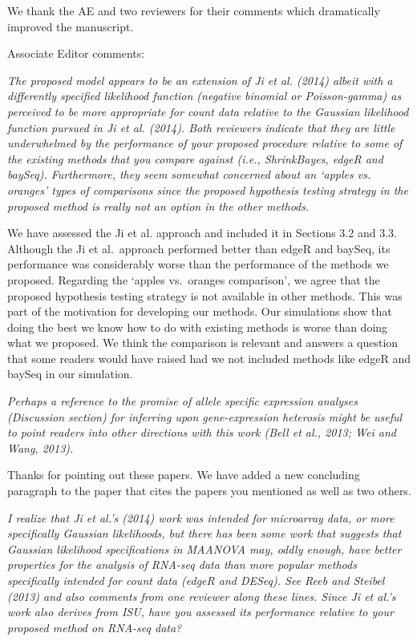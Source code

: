 \documentclass{article}
\newcommand{\comment}[1]{\textit{#1}}
\newcommand{\response}[1]{#1}
\begin{document}
\response{We thank the AE and two reviewers for their comments which dramatically improved the manuscript.}

Associate Editor comments:

\comment{The proposed model appears to be an extension of Ji et al. (2014) albeit with a differently specified likelihood function (negative binomial or Poisson-gamma) as perceived to be more appropriate for count data relative to the Gaussian likelihood function pursued in Ji et al. (2014). Both reviewers indicate that they are little underwhelmed by the performance of your proposed procedure relative to some of the existing methods that you compare against (i.e., ShrinkBayes, edgeR and baySeq).  Furthermore, they seem somewhat concerned about an ‘apples vs. oranges’ types of comparisons since the proposed hypothesis testing strategy in the proposed method is really not an option in the other methods.}

\response{We have assessed the Ji et al. approach and included it in Sections 3.2 and 3.3. Although the Ji et al.\ approach performed better than edgeR and baySeq, its performance was considerably worse than the performance of the methods we proposed.  Regarding the `apples vs.\ oranges comparison', we agree that the proposed hypothesis testing strategy is not available in other methods.  This was part of the motivation for developing our methods.  Our simulations show that doing the best we know how to do with existing methods is worse than doing what we proposed.  We think the comparison is relevant and answers a question that some readers would have raised had we not included methods like edgeR and baySeq in our simulation.}

\comment{Perhaps a reference to the promise of allele specific expression analyses (Discussion section) for inferring upon gene-expression heterosis might be useful to point readers into other directions with this work (Bell et al., 2013; Wei and Wang, 2013).}

\response{Thanks for pointing out these papers.  We have added a new concluding paragraph to the paper that cites the papers you mentioned as well as two others.}

\comment{I realize that Ji et al.’s (2014) work was intended for microarray data, or more specifically Gaussian likelihoods, but there has been some work that suggests that Gaussian likelihood specifications in MAANOVA may, oddly enough, have better properties for the analysis of RNA-seq data than more popular methods specifically intended for count data (edgeR and DESeq).  See Reeb and Steibel (2013) and also comments from one reviewer along these lines.  Since Ji et al.’s work also derives from ISU, have you assessed its performance relative to your proposed method on RNA-seq data?}
\end{document}
